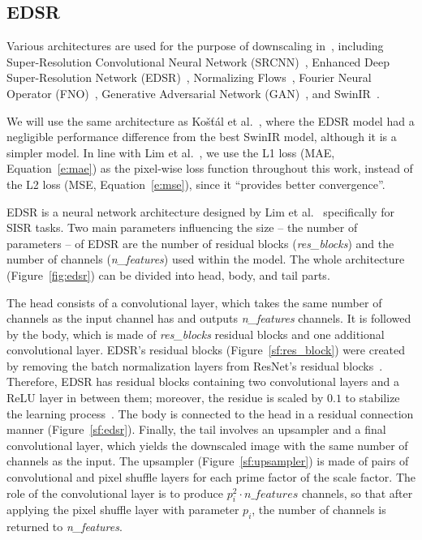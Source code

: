 \subsection{EDSR}

Various architectures are used for the purpose of downscaling in~\cite{Yang2024, Kostal2025, Vandal2017, Groenke2020, Rampal2025}, including Super-Resolution Convolutional Neural Network (SRCNN)~\cite{Dong2015}, Enhanced Deep Super-Resolution Network (EDSR)~\cite{Lim2017}, Normalizing Flows~\cite{Rezende2015}, Fourier Neural Operator (FNO)~\cite{Li2021}, Generative Adversarial Network (GAN)~\cite{Goodfellow2016}, and SwinIR~\cite{Liang2021}.

We will use the same architecture as Košťál et al.~\cite{Kostal2025}, where the EDSR model had a negligible performance difference from the best SwinIR model, although it is a simpler model.
In line with Lim et al.~\cite{Lim2017}, we use the L1 loss (MAE, Equation~\eqref{e:mae}) as the pixel-wise loss function throughout this work, instead of the L2 loss (MSE, Equation~\eqref{e:mse}), since it ``provides better convergence''.

EDSR is a neural network architecture designed by Lim et al.~\cite{Lim2017} specifically for SISR tasks.
Two main parameters influencing the size -- the number of parameters -- of EDSR are the number of residual blocks (\textit{res\_blocks}) and the number of channels (\textit{n\_features}) used within the model.
The whole architecture (Figure~\ref{fig:edsr}) can be divided into head, body, and tail parts.

The head consists of a convolutional layer, which takes the same number of channels as the input channel has and outputs \textit{n\_features} channels.
It is followed by the body, which is made of \textit{res\_blocks} residual blocks and one additional convolutional layer.
EDSR's residual blocks (Figure~\ref{sf:res_block}) were created by removing the batch normalization layers from ResNet's residual blocks~\cite{Lim2017}.
Therefore, EDSR has residual blocks containing two convolutional layers and a ReLU layer in between them; moreover, the residue is scaled by $0.1$ to stabilize the learning process~\cite{Lim2017}.
The body is connected to the head in a residual connection manner (Figure~\ref{sf:edsr}).
Finally, the tail involves an upsampler and a final convolutional layer, which yields the downscaled image with the same number of channels as the input.
The upsampler (Figure~\ref{sf:upsampler}) is made of pairs of convolutional and pixel shuffle layers for each prime factor of the scale factor.
The role of the convolutional layer is to produce $p_i^2 \cdot \textit{n\_features}$ channels, so that after applying the pixel shuffle layer with parameter $p_i$, the number of channels is returned to \textit{n\_features}.

